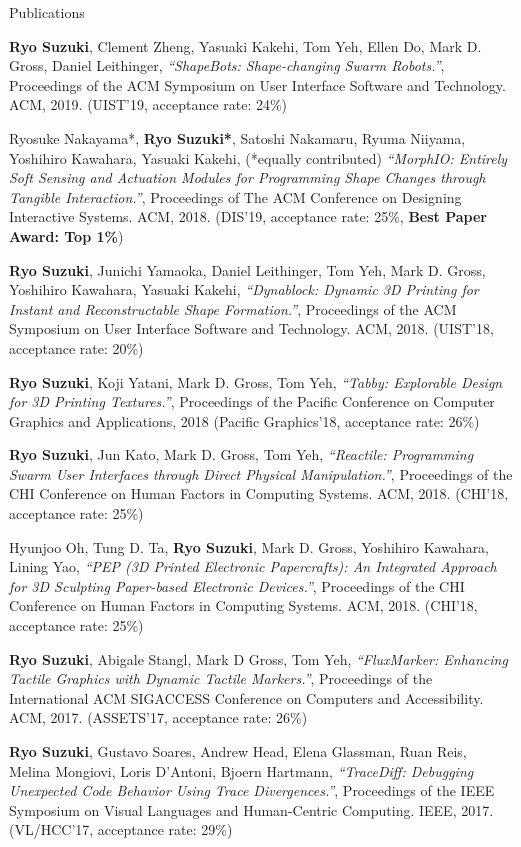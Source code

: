 \documentclass{resume} %
\begin{document}
\begin{rSection}{Publications}

{\bf Ryo Suzuki}, Clement Zheng, Yasuaki Kakehi, Tom Yeh, Ellen Do, Mark D. Gross, Daniel Leithinger,
{\it ``ShapeBots: Shape-changing Swarm Robots.''},
Proceedings of the ACM Symposium on User Interface Software and Technology. ACM, 2019.
(UIST'19, acceptance rate: 24\%)

Ryosuke Nakayama*, {\bf Ryo Suzuki*}, Satoshi Nakamaru, Ryuma Niiyama, Yoshihiro Kawahara, Yasuaki Kakehi, (*equally contributed)
{\it ``MorphIO: Entirely Soft Sensing and Actuation Modules for Programming Shape Changes through Tangible Interaction.''},
Proceedings of The ACM Conference on Designing Interactive Systems. ACM, 2018.
(DIS'19, acceptance rate: 25\%, {\bf Best Paper Award: Top 1\%})

{\bf Ryo Suzuki}, Junichi Yamaoka, Daniel Leithinger, Tom Yeh, Mark D. Gross, Yoshihiro Kawahara, Yasuaki Kakehi,
{\it ``Dynablock: Dynamic 3D Printing for Instant and Reconstructable Shape Formation.''},
Proceedings of the ACM Symposium on User Interface Software and Technology. ACM, 2018.
(UIST'18, acceptance rate: 20\%)

{\bf Ryo Suzuki}, Koji Yatani, Mark D. Gross, Tom Yeh,
{\it ``Tabby: Explorable Design for 3D Printing Textures.''},
Proceedings of the Pacific Conference on Computer Graphics and Applications, 2018
(Pacific Graphics'18, acceptance rate: 26\%)

{\bf Ryo Suzuki}, Jun Kato, Mark D. Gross, Tom Yeh,
{\it ``Reactile: Programming Swarm User Interfaces through Direct Physical Manipulation.''},
Proceedings of the CHI Conference on Human Factors in Computing Systems. ACM, 2018.
(CHI'18, acceptance rate: 25\%)

Hyunjoo Oh, Tung D. Ta, {\bf Ryo Suzuki}, Mark D. Gross, Yoshihiro Kawahara, Lining Yao,
{\it ``PEP (3D Printed Electronic Papercrafts): An Integrated Approach for 3D Sculpting Paper-based Electronic Devices.''},
Proceedings of the CHI Conference on Human Factors in Computing Systems. ACM, 2018.
(CHI'18, acceptance rate: 25\%)

{\bf Ryo Suzuki}, Abigale Stangl, Mark D Gross, Tom Yeh,
{\it ``FluxMarker: Enhancing Tactile Graphics with Dynamic Tactile Markers.''},
Proceedings of the International ACM SIGACCESS Conference on Computers and Accessibility. ACM, 2017.
(ASSETS'17, acceptance rate: 26\%)

{\bf Ryo Suzuki}, Gustavo Soares, Andrew Head, Elena Glassman, Ruan Reis, Melina Mongiovi, Loris D'Antoni, Bjoern Hartmann,
{\it ``TraceDiff: Debugging Unexpected Code Behavior Using Trace Divergences.''},
Proceedings of the IEEE Symposium on Visual Languages and Human-Centric Computing. IEEE, 2017.
(VL/HCC'17, acceptance rate: 29\%)


\end{rSection}
\end{document}
